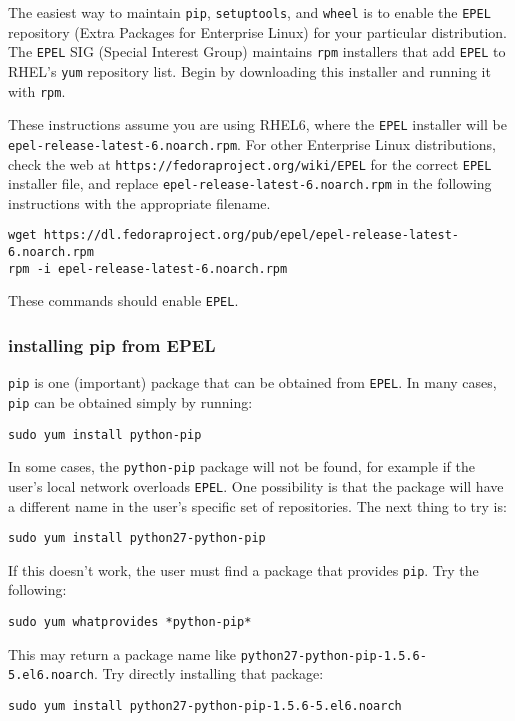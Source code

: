 The easiest way to maintain \verb|pip|, \verb|setuptools|, and \verb|wheel|
is to enable the \verb|EPEL| repository (Extra Packages for Enterprise Linux)
for your particular distribution.
The \verb|EPEL| SIG (Special Interest Group) 
maintains \verb|rpm| installers that add \verb|EPEL| 
to RHEL's \verb|yum| repository list.
Begin by downloading this installer
and running it with \verb|rpm|.

These instructions assume you are using RHEL6,
where the \verb|EPEL| installer will be 
\verb|epel-release-latest-6.noarch.rpm|.
For other Enterprise Linux distributions,
check the web at \verb|https://fedoraproject.org/wiki/EPEL|
for the correct \verb|EPEL| installer file,
and replace \verb|epel-release-latest-6.noarch.rpm|
in the following instructions with the appropriate filename.
\begin{lstlisting}
wget https://dl.fedoraproject.org/pub/epel/epel-release-latest-6.noarch.rpm
rpm -i epel-release-latest-6.noarch.rpm  
\end{lstlisting}
These commands should enable \verb|EPEL|.


\subsubsection{installing pip from EPEL}
\label{subsubsec:pip_from_epel}

\verb|pip| is one (important) package that can be obtained from \verb|EPEL|.
In many cases, \verb|pip| can be obtained simply by running:
\begin{lstlisting}
sudo yum install python-pip
\end{lstlisting}
In some cases, the \verb|python-pip| package will not be found,
for example if the user's local network overloads \verb|EPEL|.
One possibility is that the package will have a different name
in the user's specific set of repositories.
The next thing to try is:
\begin{lstlisting}
sudo yum install python27-python-pip
\end{lstlisting}
If this doesn't work, 
the user must find a package that provides \verb|pip|.
Try the following:
\begin{lstlisting}
sudo yum whatprovides *python-pip*
\end{lstlisting}
This may return a package name like 
\verb|python27-python-pip-1.5.6-5.el6.noarch|.
Try directly installing that package:
\begin{lstlisting}
sudo yum install python27-python-pip-1.5.6-5.el6.noarch
\end{lstlisting}



